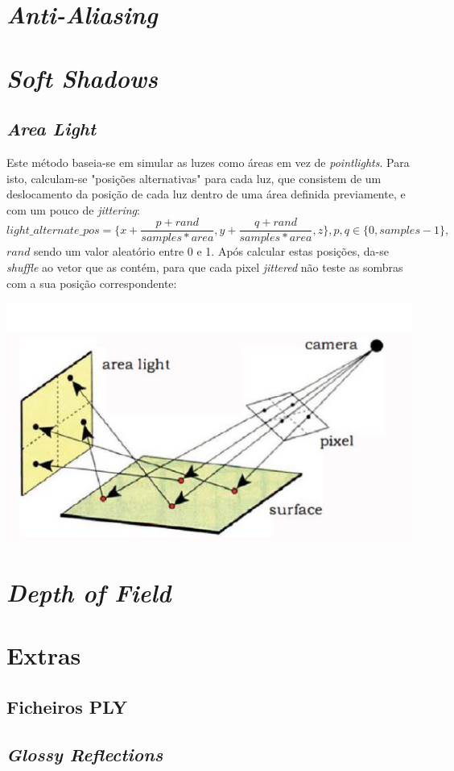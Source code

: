 \documentclass{article}
\begin{document}
    \section*{\textit{Anti-Aliasing}}
        \par


    \section*{\textit{Soft Shadows}}
        \subsection*{\textit{Area Light}}
            \par
            Este método baseia-se em simular as luzes como áreas em vez de \textit{pointlights}. Para isto, calculam-se "posições alternativas" para cada luz, que consistem de um deslocamento da posição de cada luz dentro de uma área definida previamente, e com um pouco de \textit{jittering}:
            $$ light\_alternate\_pos = \{x + \frac{p + rand}{samples * area}, y + \frac{q + rand}{samples * area}, z\}, p,q \in \{0, samples - 1\},$$
            $rand$ sendo um valor aleatório entre 0 e 1. Após calcular estas posições, da-se \textit{shuffle} ao vetor que as contém, para que cada pixel \textit{jittered} não teste as sombras com a sua posição correspondente:
            \begin{center}
                \includegraphics[scale=0.5]{area} 
            \end{center}

        
    \section*{\textit{Depth of Field}}
        \par

    \section*{Extras}  
        \subsection*{Ficheiros PLY}
        \par

        \subsection*{\textit{Glossy Reflections}}  
        \par
\end{document}
